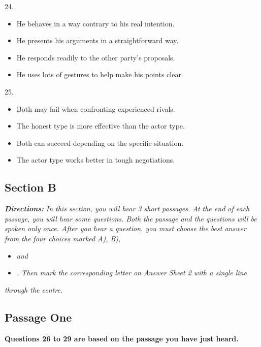 \documentclass[UTF8,11pt]{ctexart}
\begin{document}
24.


\begin{itemize}[leftmargin=2em,itemsep=.2em,topsep=.4em]\item[A.] He behaves in a way contrary to his real intention.
\item[B.] He presents his arguments in a straightforward way.
\item[C.] He responds readily to the other party's proposals.
\item[D.] He uses lots of gestures to help make his points clear.
\end{itemize}

25.


\begin{itemize}[leftmargin=2em,itemsep=.2em,topsep=.4em]\item[A.] Both may fail when confronting experienced rivals.
\item[B.] The honest type is more effective than the actor type.
\item[C.] Both can succeed depending on the specific situation.
\item[D.] The actor type works better in tough negotiations.
\end{itemize}

\subsection*{\textbf{Section B}}


\textbf{\textit{Directions:}}\textit{ In this section, you will hear 3 short passages. At the end of each passage, you will hear} \textit{some questions. Both the passage and the questions will be spoken only once. After you} \textit{hear a question, you must choose the best answer from the four choices marked A), B),}


\begin{itemize}[leftmargin=2em,itemsep=.2em,topsep=.4em]\item[C.] \textit{and}
\item[D.] \textit{. Then mark the corresponding letter on Answer Sheet 2 with a single line}
\end{itemize}

\textit{through the centre.}


\subsection*{\textbf{Passage One}}


\textbf{Questions 26 to 29 are based on the passage you have just heard.}
\end{document}
